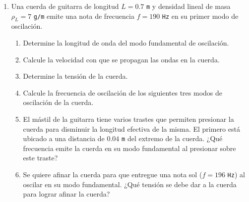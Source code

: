 \documentclass[letterpaper,11pt]{article}
\begin{document}
\begin{enumerate}
\newpage   
\item Una cuerda de guitarra de longitud $L=0.7$ \texttt{m} y densidad lineal de masa $\rho_L = 7 $ \texttt{g/m} emite una nota de frecuencia $f=190$ \texttt{Hz} en su primer modo de oscilación.
    \begin{enumerate}
        \item Determine la longitud de onda del modo fundamental de oscilación.
        \item Calcule la velocidad con que se propagan las ondas en la cuerda.
        \item Determine la tensión de la cuerda.
        \item Calcule la frecuencia de oscilación de los siguientes tres modos de oscilación de la cuerda.
        \item El mástil de la guitarra tiene varios trastes que permiten presionar la cuerda para disminuir la longitud efectiva de la misma. El primero está ubicado a una distancia de $0.04$ \texttt{m} del extremo de la cuerda. ¿Qué frecuencia emite la cuerda en su modo fundamental al presionar sobre este traste?
        \item Se quiere afinar la cuerda para que entregue una nota sol ($f = 196$ \texttt{Hz}) al oscilar en su modo fundamental. ¿Qué tensión se debe dar a la cuerda para lograr afinar la cuerda?
    \end{enumerate}

\end{enumerate}
\end{document}
